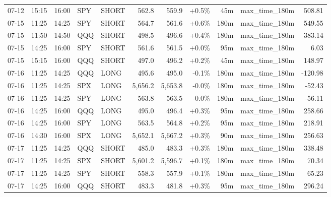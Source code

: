 \documentclass[11pt,a4paper,twoside]{article}
\begin{document}
\begin{center}
\begin{longtable}{>{\color{txtmain}}l l l l l r r r r >{\color{txtmain}}l r}
07-12 & 15:15 & 16:00 & SPY & SHORT & 562.8 & 559.9 & \textcolor{wingreen}{+0.5\%} & 45m & max\_time\_180m & \textcolor{wingreen}{508.81} \\
07-15 & 11:25 & 14:25 & SPY & SHORT & 564.7 & 561.6 & \textcolor{wingreen}{+0.6\%} & 180m & max\_time\_180m & \textcolor{wingreen}{549.55} \\
07-15 & 11:50 & 14:50 & QQQ & SHORT & 498.5 & 496.6 & \textcolor{wingreen}{+0.4\%} & 180m & max\_time\_180m & \textcolor{wingreen}{383.14} \\
07-15 & 14:25 & 16:00 & SPY & SHORT & 561.6 & 561.5 & \textcolor{wingreen}{+0.0\%} & 95m & max\_time\_180m & \textcolor{wingreen}{6.03} \\
07-15 & 15:15 & 16:00 & QQQ & SHORT & 497.0 & 496.2 & \textcolor{wingreen}{+0.2\%} & 45m & max\_time\_180m & \textcolor{wingreen}{148.97} \\
07-16 & 11:25 & 14:25 & QQQ & LONG & 495.6 & 495.0 & \textcolor{lossred}{-0.1\%} & 180m & max\_time\_180m & \textcolor{lossred}{-120.98} \\
07-16 & 11:25 & 14:25 & SPX & LONG & 5,656.2 & 5,653.8 & \textcolor{lossred}{-0.0\%} & 180m & max\_time\_180m & \textcolor{lossred}{-52.43} \\
07-16 & 11:25 & 14:25 & SPY & LONG & 563.8 & 563.5 & \textcolor{lossred}{-0.0\%} & 180m & max\_time\_180m & \textcolor{lossred}{-56.11} \\
07-16 & 14:25 & 16:00 & QQQ & LONG & 495.0 & 496.4 & \textcolor{wingreen}{+0.3\%} & 95m & max\_time\_180m & \textcolor{wingreen}{258.66} \\
07-16 & 14:25 & 16:00 & SPY & LONG & 563.5 & 564.8 & \textcolor{wingreen}{+0.2\%} & 95m & max\_time\_180m & \textcolor{wingreen}{218.91} \\
07-16 & 14:30 & 16:00 & SPX & LONG & 5,652.1 & 5,667.2 & \textcolor{wingreen}{+0.3\%} & 90m & max\_time\_180m & \textcolor{wingreen}{256.63} \\
07-17 & 11:25 & 14:25 & QQQ & SHORT & 485.0 & 483.3 & \textcolor{wingreen}{+0.3\%} & 180m & max\_time\_180m & \textcolor{wingreen}{338.48} \\
07-17 & 11:25 & 14:25 & SPX & SHORT & 5,601.2 & 5,596.7 & \textcolor{wingreen}{+0.1\%} & 180m & max\_time\_180m & \textcolor{wingreen}{70.34} \\
07-17 & 11:25 & 14:25 & SPY & SHORT & 558.3 & 557.9 & \textcolor{wingreen}{+0.1\%} & 180m & max\_time\_180m & \textcolor{wingreen}{65.23} \\
07-17 & 14:25 & 16:00 & QQQ & SHORT & 483.3 & 481.8 & \textcolor{wingreen}{+0.3\%} & 95m & max\_time\_180m & \textcolor{wingreen}{296.24} \\

\end{longtable}
\end{center}
\end{document}
